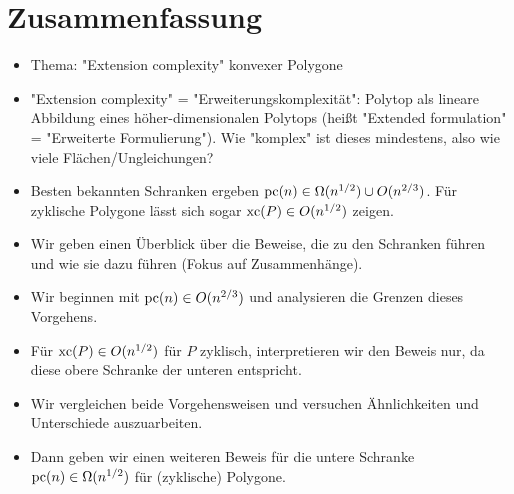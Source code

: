 \section*{Zusammenfassung}

\begin{itemize}
  \item Thema: "Extension complexity" konvexer Polygone
  \item "Extension complexity" = "Erweiterungskomplexität": Polytop als lineare Abbildung eines höher-dimensionalen Polytops (heißt "Extended formulation" = "Erweiterte Formulierung"). Wie "komplex" ist dieses mindestens, also wie viele Flächen/Ungleichungen?
  \item Besten bekannten Schranken ergeben $\operatorname{pc}(n) \in \Omega(n^{1/2}) \cup O(n^{2/3})$. Für zyklische Polygone lässt sich sogar $\operatorname{xc}(P) \in O(n^{1/2})$ zeigen.
  \item Wir geben einen Überblick über die Beweise, die zu den Schranken führen und wie sie dazu führen (Fokus auf Zusammenhänge).
  \item Wir beginnen mit $\operatorname{pc}(n) \in O(n^{2/3})$ und analysieren die Grenzen dieses Vorgehens.
  \item Für $\operatorname{xc}(P) \in O(n^{1/2})$ für $P$ zyklisch, interpretieren wir den Beweis nur, da diese obere Schranke der unteren entspricht.
  \item Wir vergleichen beide Vorgehensweisen und versuchen Ähnlichkeiten und Unterschiede auszuarbeiten.
  \item Dann geben wir einen weiteren Beweis für die untere Schranke $\operatorname{pc}(n) \in \Omega(n^{1/2})$ für (zyklische) Polygone. 
\end{itemize}

\newpage
